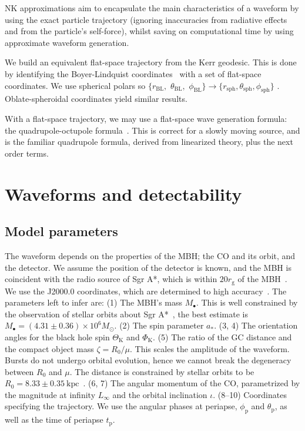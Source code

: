 \documentclass[11pt,twoside]{article}
\begin{document}
NK approximations aim to encapsulate the main characteristics of a waveform by using the exact particle trajectory (ignoring inaccuracies from radiative effects and from the particle's self-force), whilst saving on computational time by using approximate waveform generation.

We build an equivalent flat-space trajectory from the Kerr geodesic. This is done by identifying the Boyer-Lindquist coordinates~\citep{Boyer1967} with a set of flat-space coordinates. We use spherical polars so $\{r_\mathrm{BL},$ $\theta_\mathrm{BL},$ $\phi_\mathrm{BL}\} \rightarrow \{r_\mathrm{sph}, \theta_\mathrm{sph}, \phi_\mathrm{sph}\}$ \citep*{Gair2005}. Oblate-spheroidal coordinates yield similar results.

With a flat-space trajectory, we may use a flat-space wave generation formula: the quadrupole-octupole formula~\citep{Bekenstein1973, Press1977, Yunes2008}. This is correct for a slowly moving source, and is the familiar quadrupole formula, derived from linearized theory, plus the next order terms.  

\section{Waveforms and detectability}\label{sec:Waveforms}

\subsection{Model parameters}

The waveform depends on the properties of the MBH; the CO and its orbit, and the detector. We assume the position of the detector is known, and the MBH is coincident with the radio source of Sgr A*, which is within $20 r_\mathrm{g}$ of the MBH~\citep{Reid2003,Doeleman2008}. We use the J2000.0 coordinates, which are determined to high accuracy~\citep{Reid1999, Yusef-Zadeh1999}. The parameters left to infer are: (1) The MBH's mass $M_\bullet$. This is well constrained by the observation of stellar orbits about Sgr A*~\citep{Ghez2008, Gillessen2009}, the best estimate is $M_\bullet = (4.31 \pm 0.36) \times 10^6 M_\odot$. (2) The spin parameter $a_\ast$. (3, 4) The orientation angles for the black hole spin $\Theta_\mathrm{K}$ and $\Phi_\mathrm{K}$. (5) The ratio of the GC distance and the compact object mass $\zeta = R_0/\mu$. This scales the amplitude of the waveform. Bursts do not undergo orbital evolution, hence we cannot break the degeneracy between $R_0$ and $\mu$. The distance is constrained by stellar orbits to be $R_0 = 8.33 \pm 0.35~\mathrm{kpc}$~\citep{Gillessen2009}. (6, 7) The angular momentum of the CO, parametrized by the magnitude at infinity $L_\infty$ and the orbital inclination $\iota$. (8--10) Coordinates specifying the trajectory. We use the angular phases at periapse, $\phi_\mathrm{p}$ and $\theta_\mathrm{p}$, as well as the time of periapse $t_\mathrm{p}$.
\end{document}
